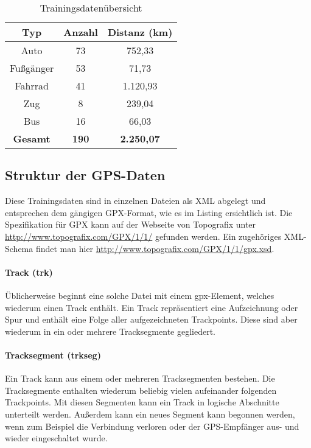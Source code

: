 \begin{table}
\centering
\begin{tabular}{| c | c | c | }
\hline
\textbf{Typ} & \textbf{Anzahl} & \textbf{Distanz (km)}\\ 
\hline
Auto & 73 & 752,33\\
\hline
Fußgänger &	53 & 71,73\\
\hline
Fahrrad	& 41 & 1.120,93\\
\hline
Zug & 8 & 239,04\\
\hline
Bus	& 16 & 66,03\\
\hline
\textbf{Gesamt} & \textbf{190} & \textbf{2.250,07}\\
\hline
\end{tabular}
\caption{Trainingsdatenübersicht}
\label{datenuebsicht}
\end{table}

\subsection{Struktur der GPS-Daten}
Diese Trainingsdaten sind in einzelnen Dateien als XML abgelegt und entsprechen dem gängigen GPX-Format, wie es im Listing  ersichtlich ist. Die Spezifikation für GPX kann auf der Webseite von Topografix unter \url{ http://www.topografix.com/GPX/1/1/} gefunden werden. Ein zugehöriges XML-Schema findet man hier \url{http://www.topografix.com/GPX/1/1/gpx.xsd}. \cite{topografix_gpx_2004} 

\paragraph{Track (trk)}
Üblicherweise beginnt eine solche Datei mit einem gpx-Element, welches wiederum einen Track enthält. Ein Track repräsentiert eine Aufzeichnung oder Spur und enthält eine Folge aller aufgezeichneten Trackpoints. Diese sind aber wiederum in ein oder mehrere Tracksegmente gegliedert.

\paragraph{Tracksegment (trkseg)}
Ein Track kann aus einem oder mehreren Tracksegmenten bestehen. Die Tracksegmente enthalten wiederum beliebig vielen aufeinander folgenden Trackpoints. Mit diesen Segmenten kann ein Track in logische Abschnitte unterteilt werden. Außerdem kann ein neues Segment kann begonnen werden, wenn zum Beispiel die Verbindung verloren oder der GPS-Empfänger aus- und wieder eingeschaltet wurde.

